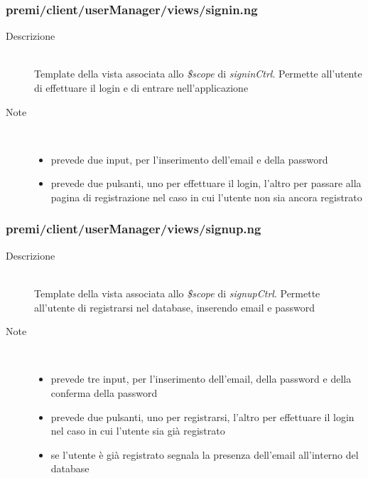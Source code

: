 \subsubsection{premi/client/userManager/views/signin.ng}

\begin{description}
\item[Descrizione] \hfill \\
	Template della vista associata allo \textit{\$scope} di \textit{signinCtrl}. Permette all'utente di effettuare il login e di entrare nell'applicazione
\item[Note] \hfill \\
	\begin{itemize}
			\item prevede due input, per l'inserimento dell'email e della password
			\item prevede due pulsanti, uno per effettuare il login, l'altro per passare alla pagina di registrazione nel caso in cui l'utente non sia ancora registrato
	\end{itemize}
\end{description}


\subsubsection{premi/client/userManager/views/signup.ng}

\begin{description}
\item[Descrizione] \hfill \\
	Template della vista associata allo \textit{\$scope} di \textit{signupCtrl}. Permette all'utente di registrarsi nel database, inserendo email e password
\item[Note] \hfill \\
	\begin{itemize}
			\item prevede tre input, per l'inserimento dell'email, della password e della conferma della password
			\item prevede due pulsanti, uno per registrarsi, l'altro per effettuare il login nel caso in cui l'utente sia già registrato
			\item se l'utente è già registrato segnala la presenza dell'email all'interno del database
	\end{itemize}
\end{description}


